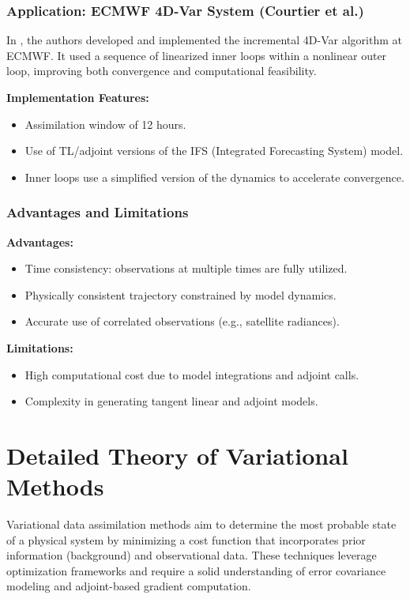 \documentclass[a4paper]{article}
\begin{document}
\subsubsection*{Application: ECMWF 4D-Var System (Courtier et al.)}

In \textcite{courtier1994strategy}, the authors developed and implemented the incremental 4D-Var algorithm at ECMWF. It used a sequence of linearized inner loops within a nonlinear outer loop, improving both convergence and computational feasibility.

\textbf{Implementation Features:}
\begin{itemize}
  \item Assimilation window of 12 hours.
  \item Use of TL/adjoint versions of the IFS (Integrated Forecasting System) model.
  \item Inner loops use a simplified version of the dynamics to accelerate convergence.
\end{itemize}

\subsubsection*{Advantages and Limitations}

\textbf{Advantages:}
\begin{itemize}
  \item Time consistency: observations at multiple times are fully utilized.
  \item Physically consistent trajectory constrained by model dynamics.
  \item Accurate use of correlated observations (e.g., satellite radiances).
\end{itemize}

\textbf{Limitations:}
\begin{itemize}
  \item High computational cost due to model integrations and adjoint calls.
  \item Complexity in generating tangent linear and adjoint models.
\end{itemize}


\section{Detailed Theory of Variational Methods}

Variational data assimilation methods aim to determine the most probable state of a physical system by minimizing a cost function that incorporates prior information (background) and observational data. These techniques leverage optimization frameworks and require a solid understanding of error covariance modeling and adjoint-based gradient computation.
\end{document}
